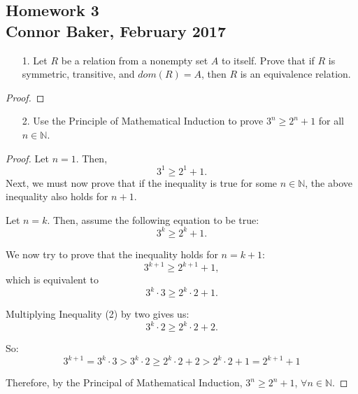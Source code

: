 \documentclass[10pt]{article}
\theoremstyle{definition}
\theoremstyle{plain}
\newcommand{\N}{\mathbb{N}}
\begin{document}
\begin{center}
  \subsection*{Homework 3\\Connor Baker, February 2017}
\end{center}

\begin{enumerate}
\item[1.] Let $R$ be a relation from a nonempty set $A$ to itself.  Prove that if $R$ is symmetric, transitive, and $dom(R) = A$, then $R$ is an equivalence relation.
\end{enumerate}

\begin{proof}
\end{proof}



\pagebreak



\begin{enumerate}
  \item[2.] Use the Principle of Mathematical Induction to prove $3^n \geq 2^n + 1$ for all $n \in \N$.
\end{enumerate}

\begin{proof}
  Let $n=1$. Then,
  \begin{equation}
    3^1 \geq 2^1 + 1.
  \end{equation}
  Next, we must now prove that if the inequality is true for some $n\in\N$, the above inequality also holds for $n+1$.

  \par Let $n=k$. Then, assume the following equation to be true:
  \begin{equation}
    3^k \geq 2^k + 1.
  \end{equation}

  \par We now try to prove that the inequality holds for $n=k+1$:
  \begin{equation}
    3^{k+1} \geq 2^{k+1} + 1,
  \end{equation}
  which is equivalent to
  \begin{equation}
    3^{k}\cdot 3 \geq 2^{k}\cdot 2 + 1.
  \end{equation}

  \par Multiplying Inequality (2) by two gives us:
  \begin{equation}
    3^{k}\cdot 2 \geq 2^{k}\cdot 2 + 2.
  \end{equation}

  \par So:
    $$3^{k+1}=3^{k}\cdot 3 > 3^{k}\cdot 2 \geq 2^{k}\cdot 2 + 2 > 2^{k}\cdot 2 + 1 = 2^{k+1}+1$$

  \par Therefore, by the Principal of Mathematical Induction, $3^n \geq 2^n + 1$, $\forall n\in\N$.
\end{proof}
\end{document}
